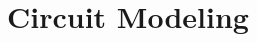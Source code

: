 \documentclass[a4paper, 10pt, twoside, twocolumn]{scrartcl}
\begin{document}
%
	
\section{Circuit Modeling}
\end{document}
